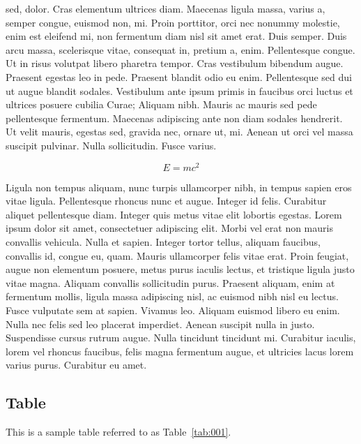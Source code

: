 \documentclass[11pt,A4]{article}
\begin{document}
sed, dolor. Cras elementum ultrices diam. Maecenas ligula massa, varius
a, semper congue, euismod non, mi. Proin porttitor, orci nec nonummy
molestie, enim est eleifend mi, non fermentum diam nisl sit amet erat.
Duis semper. Duis arcu massa, scelerisque vitae, consequat in, pretium
a, enim. Pellentesque congue. Ut in risus volutpat libero pharetra
tempor. Cras vestibulum bibendum augue. Praesent egestas leo in pede.
Praesent blandit odio eu enim. Pellentesque sed dui ut augue blandit
sodales. Vestibulum ante ipsum primis in faucibus orci luctus et
ultrices posuere cubilia Curae; Aliquam nibh. Mauris ac mauris sed pede
pellentesque fermentum. Maecenas adipiscing ante non diam sodales
hendrerit. Ut velit mauris, egestas sed, gravida nec, ornare ut, mi.
Aenean ut orci vel massa suscipit pulvinar. Nulla sollicitudin. Fusce
varius.



\begin{equation}
  \label{eq:001}
  E = mc^2
\end{equation}

Ligula non tempus aliquam, nunc turpis ullamcorper nibh, in
tempus sapien eros vitae ligula. Pellentesque rhoncus nunc et augue.
Integer id felis. Curabitur aliquet pellentesque diam. Integer quis
metus vitae elit lobortis egestas. Lorem ipsum dolor sit amet,
consectetuer adipiscing elit. Morbi vel erat non mauris convallis
vehicula. Nulla et sapien. Integer tortor tellus, aliquam faucibus,
convallis id, congue eu, quam. Mauris ullamcorper felis vitae erat.
Proin feugiat, augue non elementum posuere, metus purus iaculis lectus,
et tristique ligula justo vitae magna. Aliquam convallis sollicitudin
purus. Praesent aliquam, enim at fermentum mollis, ligula massa
adipiscing nisl, ac euismod nibh nisl eu lectus. Fusce vulputate sem at
sapien. Vivamus leo. Aliquam euismod libero eu enim. Nulla nec felis sed
leo placerat imperdiet. Aenean suscipit nulla in justo. Suspendisse
cursus rutrum augue. Nulla tincidunt tincidunt mi. Curabitur iaculis,
lorem vel rhoncus faucibus, felis magna fermentum augue, et ultricies
lacus lorem varius purus. Curabitur eu amet.


\subsection{Table}
This is a sample table referred to as Table~\ref{tab:001}.
\end{document}
